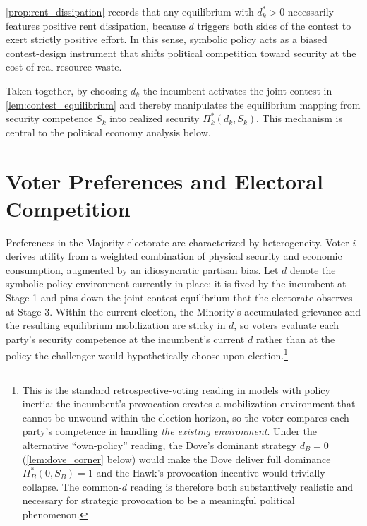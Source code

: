 \documentclass[11pt,twoside]{extarticle}
\begin{document}
\autoref{prop:rent_dissipation} records that any equilibrium with $d_k^*>0$ necessarily features positive rent dissipation, because $d$ triggers both sides of the contest to exert strictly positive effort. In this sense, symbolic policy acts as a biased contest-design instrument that shifts political competition toward security at the cost of real resource waste.


Taken together, by choosing $d_k$ the incumbent activates the joint contest in \autoref{lem:contest_equilibrium} and thereby manipulates the equilibrium mapping from security competence $S_k$ into realized security $\Pi_k^*(d_k,S_k)$. This mechanism is central to the political economy analysis below.


\section{Voter Preferences and Electoral Competition}

Preferences in the Majority electorate are characterized by heterogeneity. Voter $i$ derives utility from a weighted combination of physical security and economic consumption, augmented by an idiosyncratic partisan bias. Let $d$ denote the symbolic-policy environment currently in place: it is fixed by the incumbent at Stage 1 and pins down the joint contest equilibrium that the electorate observes at Stage 3. Within the current election, the Minority's accumulated grievance and the resulting equilibrium mobilization are sticky in $d$, so voters evaluate each party's security competence at the incumbent's current $d$ rather than at the policy the challenger would hypothetically choose upon election.\footnote{This is the standard retrospective-voting reading in models with policy inertia: the incumbent's provocation creates a mobilization environment that cannot be unwound within the election horizon, so the voter compares each party's competence in handling \emph{the existing environment}. Under the alternative ``own-policy'' reading, the Dove's dominant strategy $d_B=0$ (\autoref{lem:dove_corner} below) would make the Dove deliver full dominance $\Pi_B^*(0,S_B)=1$ and the Hawk's provocation incentive would trivially collapse. The common-$d$ reading is therefore both substantively realistic and necessary for strategic provocation to be a meaningful political phenomenon.}
\end{document}
